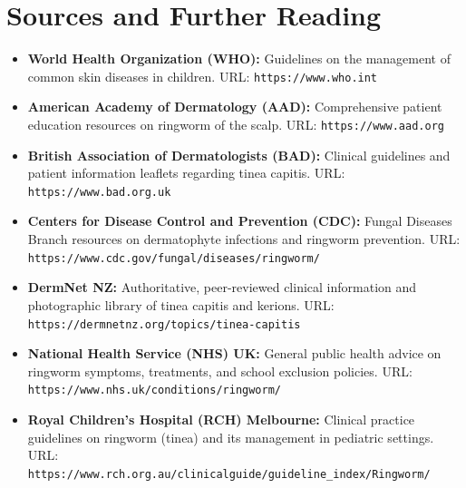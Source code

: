 \section*{Sources and Further Reading}
\begin{itemize}
    \item \textbf{World Health Organization (WHO):} Guidelines on the management of common skin diseases in children. URL: \texttt{https://www.who.int}
    \item \textbf{American Academy of Dermatology (AAD):} Comprehensive patient education resources on ringworm of the scalp. URL: \texttt{https://www.aad.org}
    \item \textbf{British Association of Dermatologists (BAD):} Clinical guidelines and patient information leaflets regarding tinea capitis. URL: \texttt{https://www.bad.org.uk}
    \item \textbf{Centers for Disease Control and Prevention (CDC):} Fungal Diseases Branch resources on dermatophyte infections and ringworm prevention. URL: \texttt{https://www.cdc.gov/fungal/diseases/ringworm/}
    \item \textbf{DermNet NZ:} Authoritative, peer-reviewed clinical information and photographic library of tinea capitis and kerions. URL: \texttt{https://dermnetnz.org/topics/tinea-capitis}
    \item \textbf{National Health Service (NHS) UK:} General public health advice on ringworm symptoms, treatments, and school exclusion policies. URL: \texttt{https://www.nhs.uk/conditions/ringworm/}
    \item \textbf{Royal Children's Hospital (RCH) Melbourne:} Clinical practice guidelines on ringworm (tinea) and its management in pediatric settings. URL: \texttt{https://www.rch.org.au/clinicalguide/guideline\_index/Ringworm/}
\end{itemize}